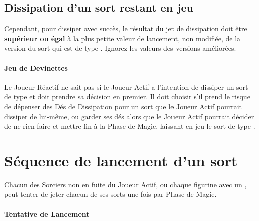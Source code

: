 \subsection{Dissipation d'un sort restant en jeu}
\label{dispel_remains_in_play_spells}

 Cependant, pour dissiper avec succès, le résultat du jet de dissipation doit être \textbf{supérieur ou égal} à la plus petite valeur de lancement, non modifiée, de la version du sort qui est de type \remainsinplay{}. Ignorez les valeurs des versions améliorées.

\paragraph{Jeu de Devinettes}

Le Joueur Réactif ne sait pas si le Joueur Actif a l'intention de dissiper un sort de type \remainsinplay{} et doit prendre sa décision en premier. Il doit choisir s'il prend le risque de dépenser des Dés de Dissipation pour un sort que le Joueur Actif pourrait dissiper de lui-même, ou garder ses dés alors que le Joueur Actif pourrait décider de ne rien faire et mettre fin à la Phase de Magie, laissant en jeu le sort de type \remainsinplay{}.

\newpage
\hypertarget{spellcastingsequence}{\section{Séquence de lancement d'un sort}}
\label{spell_casting_sequence}

Chacun des Sorciers non en fuite du Joueur Actif, ou chaque figurine avec un \boundspell{}, peut tenter de jeter chacun de ses sorts une fois par Phase de Magie.

\paragraph{Tentative de Lancement}

